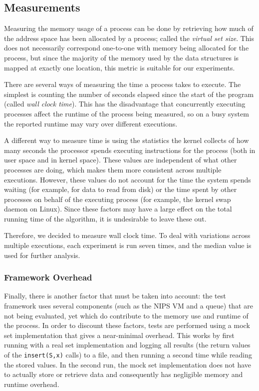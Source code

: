\documentclass{acm_proc_article-sp}
\begin{document}
\subsection{Measurements}
Measuring the memory usage of a process can be done by retrieving how much of the
address space has been allocated by a process; called the \emph{virtual set
size}. This does not necessarily correspond one-to-one with memory being allocated
for the process, but since the majority of the memory used by the
data structures is mapped at exactly one location, this metric is suitable
for our experiments.

There are several ways of measuring the time a process takes to execute.
The simplest is counting the number of seconds elapsed since the start of the
program (called \emph{wall clock time}).
This has the disadvantage that concurrently executing processes affect the runtime
of the process being measured, so on a busy system the reported runtime may vary
over different executions.

A different way to measure time is using the statistics the kernel collects
of how many seconds the processor spends executing instructions for the process
(both in user space and in kernel space). These values are independent of
what other processes are doing, which makes them more consistent across
multiple executions. However, these values do not account for the time the
system spends waiting (for example, for data to read from disk)
or the time spent by other processes on behalf of the executing process
(for example, the kernel swap daemon on Linux). Since these factors may have
a large effect on the total running time of the algorithm, it is undesirable
to leave these out.

Therefore, we decided to measure wall clock time. To deal with variations
across multiple executions, each experiment is run seven times, and the median
value is used for further analysis.

\subsubsection{Framework Overhead}
Finally, there is another factor that must be taken into account: the test
framework uses several components (such as the NIPS VM and a queue) that are
not being evaluated, yet which do contribute to the memory use and runtime
of the process. In order to discount these factors, tests are performed using
a mock set implementation that gives a near-minimal overhead. This works
by first running with a real set implementation and logging all results
(the return values of the \verb#insert(S,x)# calls) to a file, and then
running a second time while reading the stored values. In the second run,
the mock set implementation does not have to actually store or retrieve
data and consequently has negligible memory and runtime overhead.
\end{document}

